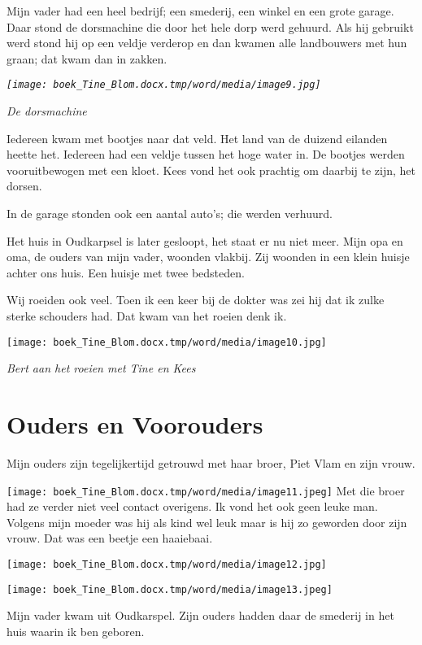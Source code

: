 \documentclass{scrbook}
\begin{document}
Mijn vader had een heel bedrijf; een smederij, een winkel en een grote garage. Daar stond de dorsmachine die door het hele dorp werd gehuurd. Als hij gebruikt werd stond hij op een veldje verderop en dan kwamen alle landbouwers met hun graan; dat kwam dan in zakken. 

\textit{\texttt{[image: boek\_Tine\_Blom.docx.tmp/word/media/image9.jpg]}}

\textit{De dorsmachine}

Iedereen kwam met bootjes naar dat veld. Het land van de duizend eilanden heette het. Iedereen had een veldje tussen het hoge water in. De bootjes werden vooruitbewogen met een kloet. Kees vond het ook prachtig om daarbij te zijn, het dorsen.

In de garage stonden ook een aantal auto’s; die werden verhuurd.

Het huis in Oudkarpsel is later gesloopt, het staat er nu niet meer. Mijn opa en oma, de ouders van mijn vader, woonden vlakbij. Zij woonden in een klein huisje achter ons huis. Een huisje met twee bedsteden.

Wij roeiden ook veel. Toen ik een keer bij de dokter was zei hij dat ik zulke sterke schouders had. Dat kwam van het roeien denk ik.

\texttt{[image: boek\_Tine\_Blom.docx.tmp/word/media/image10.jpg]}

\textit{Bert aan het roeien met Tine en Kees}

\chapter{\label{ref-003}Ouders en Voorouders}

Mijn ouders zijn tegelijkertijd getrouwd met haar broer, Piet Vlam en zijn vrouw. 

\texttt{[image: boek\_Tine\_Blom.docx.tmp/word/media/image11.jpeg]}
Met die broer had ze verder niet veel contact overigens. Ik vond het ook geen leuke man.
Volgens mijn moeder was hij als kind wel leuk maar is hij zo geworden door zijn vrouw. Dat was een beetje een haaiebaai.

\texttt{[image: boek\_Tine\_Blom.docx.tmp/word/media/image12.jpg]}

\texttt{[image: boek\_Tine\_Blom.docx.tmp/word/media/image13.jpeg]}

Mijn vader kwam uit Oudkarspel. Zijn ouders hadden daar de smederij in het huis waarin ik ben geboren. 
\end{document}
